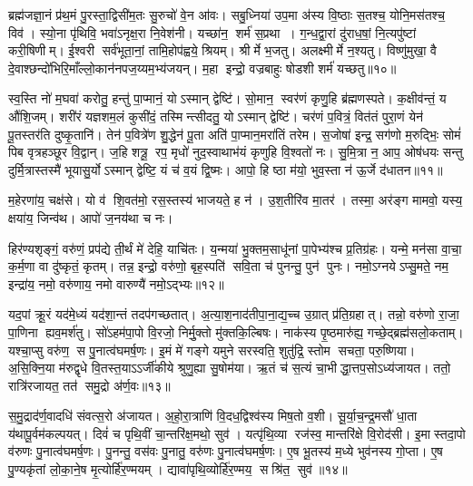 ब्रह्म॑जज्ञा॒नं प्र॑थ॒मं पु॒रस्ता॒द्विसी॑म॒तः सु॒रुचो॑ वे॒न आ॑वः। सबु॒ध्निया॑ उप॒मा अ॑स्य वि॒ष्ठाः स॒तश्च॒ योनि॒मस॑तश्च॒ विव॑। स्यो॒ना पृ॑थिवि॒ भवा॑ऽनृक्ष॒रा नि॒वेश॑नी। यच्छा॑न॒ शर्म॑ स॒प्रथा। ग॒न्ध॒द्वा॒रां दु॑राध॒\ar{}षां॒ नि॒त्यपु॑ष्टां करी॒षिणीम्। ई॒श्वरी सर्व॑भूता॒नां॒ तामि॒होप॑ह्वये॒ श्रियम्। श्रीर्मे भ॒जतु। अलक्ष्मीर्मे न॒श्यतु। विष्णु॑मुखा॒ वै दे॒वाश्छन्दो॑भिरि॒माँल्लो॒कान॑नपज॒य्यम॒भ्य॑जयन्। म॒हा इन्द्रो॒ वज्रबाहुः षोडशी शर्म॑ यच्छतु॥१०॥

 स्व॒स्ति नो॑ म॒घवा॑ करोतु॒ हन्तु॑ पा॒प्मानं॒ योऽस्मान् द्वेष्टि॑। सो॒मान॒ स्वर॑णं कृणु॒हि ब्र॑ह्मणस्पते। क॒क्षीव॑न्तं॒ य औ॑शि॒जम्। शरी॑रं यज्ञशम॒लं कुसी॑दं॒ तस्मिन्त्सीदतु॒ योऽस्मान् द्वेष्टि॑। चर॑णं प॒वित्रं॒ वित॑तं पुरा॒णं येन॑ पू॒तस्तर॑ति दुष्कृ॒तानि॑। तेन॑ प॒वित्रे॑ण शु॒द्धेन॑ पू॒ता अति॑ पा॒प्मान॒मरा॑तिं तरेम। स॒जोषा॑ इन्द्र॒ सग॑णो म॒रुद्भिः॒ सोमं॑ पिब वृत्रहञ्छूर वि॒द्वान्। ज॒हि शत्रू॒ रप॒ मृधो॑ नुद॒स्वाथाभ॑यं कृणुहि वि॒श्वतो॑ नः। सु॒मि॒त्रा न॒ आप॒ ओष॑धयः सन्तु दुर्मि॒त्रास्तस्मै॑ भूयासु॒र्योऽस्मान् द्वेष्टि॒ यं च॑ व॒यं द्वि॒ष्मः। आपो॒ हि ष्ठा म॑यो॒ भुव॒स्ता न॑ ऊ॒र्जे द॑धातन॥११॥
 
 म॒हेरणा॑य॒ चक्ष॑से। यो व॑ शि॒वत॑मो॒ रस॒स्तस्य॑ भाजयते॒ ह न॑। उ॒श॒तीरि॑व मा॒तर॑। तस्मा॒ अर॑ङ्ग मामवो॒ यस्य॒ क्षया॑य॒ जिन्व॑थ। आपो॑ ज॒नय॑था च नः।

 
हिर॑ण्यशृङ्गं॒ वरु॑णं॒ प्रप॑द्ये ती॒र्थं मे॑ देहि॒ याचि॑तः। य॒न्मया॑ भु॒क्तम॒साधू॑नां पा॒पेभ्य॑श्च प्र॒तिग्र॑हः। यन्मे॒ मन॑सा वा॒चा॒ क॒र्म॒णा वा दु॑ष्कृतं॒ कृतम्। तन्न॒ इन्द्रो॒ वरु॑णो॒ बृह॒स्पति॑ सवि॒ता च॑ पुनन्तु॒ पुन॑ पुनः। नमो॒ऽग्नयेऽप्सु॒मते॒ नम॒ इन्द्रा॑य॒ नमो॒ वरु॑णाय॒ नमो वारुण्यै॑ नमो॒ऽद्भ्यः॥१२॥

 यद॒पां क्रू॒रं यद॑मे॒ध्यं यद॑शा॒न्तं तदप॑गच्छतात्। अ॒त्या॒श॒नाद॑ती\-पा॒ना॒द्य॒च्च उ॒ग्रात् प्र॑ति॒ग्रहात्। तन्नो॒ वरु॑णो रा॒जा॒ पा॒णिना ह्यव॒मर्\mbox{}श॑तु। सो॑ऽहम॑पा॒पो वि॒रजो॒ निर्मु॒क्तो मु॑क्तकि॒ल्बिषः। नाक॑स्य पृ॒ष्ठमारु॑ह्य॒ गच्छे॒द्ब्रह्म॑सलो॒कताम्। यश्चा॒प्सु वरु॑ण॒ स पु॒नात्व॑घमर्\mbox{}ष॒णः। इ॒मं मे॑ गङ्गे यमुने सरस्वति॒ शुतु॑द्रि॒ स्तोम सचता॒ परु॒ष्णिया। अ॒सि॒क्नि॒या म॑रुद्\mbox{}वृधे वि॒तस्त॒याऽऽर्जी॑कीये श्रुणु॒ह्या सु॒षोम॑या। ऋ॒तं च॑ स॒त्यं चा॒भीद्धा॒त्तप॒सोऽध्य॑जायत। ततो॒ रात्रि॑रजायत॒ तत॑ समु॒द्रो अ॑र्ण॒वः॥१३॥
 
 स॒मु॒द्राद॑र्ण॒वादधि॑ संवत्स॒रो अ॑जायत। अ॒हो॒रा॒त्राणि॑ वि॒दध॒द्विश्व॑स्य मिष॒तो व॒शी। सू॒र्या॒च॒न्द्र॒मसौ॑ धा॒ता य॑थापू॒र्वम॑कल्पयत्। दिवं॑ च पृथि॒वीं चा॒न्तरि॑क्ष॒मथो॒ सुव॑। यत्पृ॑थि॒व्या रज॑स्व॒ मान्तरि॑क्षे वि॒रोद॑सी। इ॒मास्तदा॒पो व॑रुणः पु॒नात्व॑घमर्\mbox{}ष॒णः। पु॒नन्तु॒ वस॑वः पु॒नातु॒ वरु॑णः पु॒नात्व॑घमर्\mbox{}ष॒णः। ए॒ष भू॒तस्य॑ म॒ध्ये भुव॑नस्य गो॒प्ता। ए॒ष पु॒ण्यकृ॑तां लो॒का॒ने॒ष मृ॒त्योर्\mbox{}हि॑र॒ण्मयम्। द्यावा॑पृथि॒व्योर्\mbox{}हि॑र॒ण्मय॒ सश्रि॑त॒ सुव॑॥१४॥

